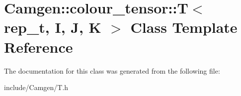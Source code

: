 \hypertarget{a00521}{\section{Camgen\-:\-:colour\-\_\-tensor\-:\-:T$<$ rep\-\_\-t, I, J, K $>$ Class Template Reference}
\label{a00521}
}


The documentation for this class was generated from the following file\-:\begin{DoxyCompactItemize}
\item 
include/\-Camgen/T.\-h\end{DoxyCompactItemize}

